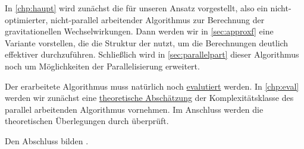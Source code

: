     In \autoref{chp:haupt} wird zunächst die  für unseren Ansatz vorgestellt, also ein nicht-optimierter, nicht-parallel arbeitender Algorithmus zur Berechnung der gravitationellen
    Wechselwirkungen. Dann werden wir in \autoref{sec:approxf} eine Variante vorstellen, die die Struktur der  nutzt, um die Berechnungen deutlich effektiver durchzuführen.
    Schließlich wird in \autoref{sec:parallelpart} dieser Algorithmus noch um Möglichkeiten der Parallelisierung erweitert.
    
    Der erarbeitete Algorithmus muss natürlich noch \hyperref[chp:eval]{evalutiert} werden. In \autoref{chp:eval} werden wir zunächst eine \hyperref[sec:theo]{theoretische Abschätzung} der 
    Komplexitätsklasse des parallel arbeitenden Algorithmus vornehmen. Im Anschluss werden die theoretischen Überlegungen durch  überprüft.
    
    Den Abschluss bilden . 
